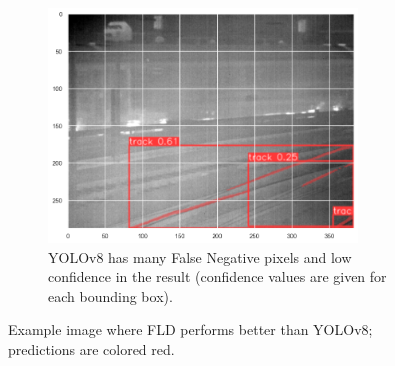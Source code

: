 \documentclass[Master,MDS,english]{BASE/twbook} %
\begin{document}
\begin{figure}[H]
\begin{subfigure}[t]{.33\textwidth}
  \includegraphics[width=0.9\textwidth]{images/results/example1_yolo}
  \caption{YOLOv8 has many False Negative pixels and low confidence in the result (confidence values are given for each bounding box). }
\end{subfigure}
\caption{Example image where FLD performs better than YOLOv8; predictions are colored red. }
\label{fig:res_example1}
\end{figure}
\end{document}
